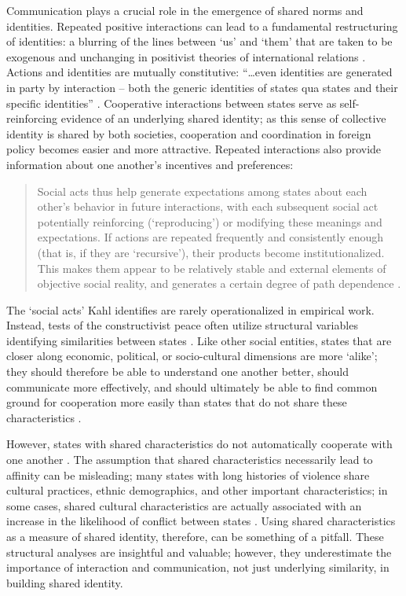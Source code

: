 \documentclass[10pt,]{article}
\begin{document}
Communication plays a crucial role in the emergence of shared norms and
identities. Repeated positive interactions can lead to a fundamental
restructuring of identities: a blurring of the lines between `us' and
`them' that are taken to be exogenous and unchanging in positivist
theories of international relations
\citetext{\citealp[246]{Wendt1999}; \citealp[573-575]{Ashizawa2008}}.
Actions and identities are mutually constitutive: ``\ldots{}even
identities are generated in party by interaction -- both the generic
identities of states qua states and their specific identities''
\citep[879]{Ruggie1998}. Cooperative interactions between states serve
as self-reinforcing evidence of an underlying shared identity; as this
sense of collective identity is shared by both societies, cooperation
and coordination in foreign policy becomes easier and more attractive.
Repeated interactions also provide information about one another's
incentives and preferences:

\begin{quote}
Social acts thus help generate expectations among states about each
other's behavior in future interactions, with each subsequent social act
potentially reinforcing (`reproducing') or modifying these meanings and
expectations. If actions are repeated frequently and consistently enough
(that is, if they are `recursive'), their products become
institutionalized. This makes them appear to be relatively stable and
external elements of objective social reality, and generates a certain
degree of path dependence \citep[104]{Kahl1998}.
\end{quote}

The `social acts' Kahl identifies are rarely operationalized in
empirical work. Instead, tests of the constructivist peace often utilize
structural variables identifying similarities between states
\citep[373-374]{Corbetta2013}. Like other social entities, states that
are closer along economic, political, or socio-cultural dimensions are
more `alike'; they should therefore be able to understand one another
better, should communicate more effectively, and should ultimately be
able to find common ground for cooperation more easily than states that
do not share these characteristics
\citetext{\citealp[27-29]{Blau1977}; \citealp[717-719]{Popielarz1995}}.

However, states with shared characteristics do not automatically
cooperate with one another \citep[495]{RisseKappen1995}. The assumption
that shared characteristics necessarily lead to affinity can be
misleading; many states with long histories of violence share cultural
practices, ethnic demographics, and other important characteristics; in
some cases, shared cultural characteristics are actually associated with
an increase in the likelihood of conflict between states
\citep[77-78]{Gartzke2006}. Using shared characteristics as a measure of
shared identity, therefore, can be something of a pitfall. These
structural analyses are insightful and valuable; however, they
underestimate the importance of interaction and communication, not just
underlying similarity, in building shared identity.
\end{document}
